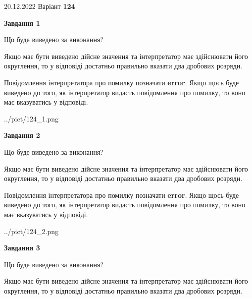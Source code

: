 \documentclass[12pt, ukrainian]{article}
\begin{document}
{20.12.2022 Варіант \No \textbf { 124 }\par}
{
\begin {Large}

{\begin {center}\textbf{Завдання 1}\end {center}}\par
Що буде виведено за виконання? \par

Якщо має бути виведено дійсне значення та інтерпретатор має здійснювати його округлення, 
то у відповіді достатньо правильно вказати два дробових розряди.

Повідомлення інтерпретатора про помилку позначати \textbf{error}.
Якщо щось буде виведено до того, як інтерпретатор видасть повідомлення про помилку, 
то воно має вказуватись у відповіді. \par

\begin{center}
	{../pict/124_1.png}
\end{center}
\newpage

{\begin {center}\textbf{Завдання 2}\end {center}}\par
Що буде виведено за виконання? \par

Якщо має бути виведено дійсне значення та інтерпретатор має здійснювати його округлення, 
то у відповіді достатньо правильно вказати два дробових розряди.

Повідомлення інтерпретатора про помилку позначати \textbf{error}.
Якщо щось буде виведено до того, як інтерпретатор видасть повідомлення про помилку, 
то воно має вказуватись у відповіді. \par

\begin{center}
	{../pict/124_2.png}
\end{center}
\newpage

{\begin {center}\textbf{Завдання 3}\end {center}}\par
Що буде виведено за виконання? \par

Якщо має бути виведено дійсне значення та інтерпретатор має здійснювати його округлення, 
то у відповіді достатньо правильно вказати два дробових розряди.


\end{Large}}
\end{document}
